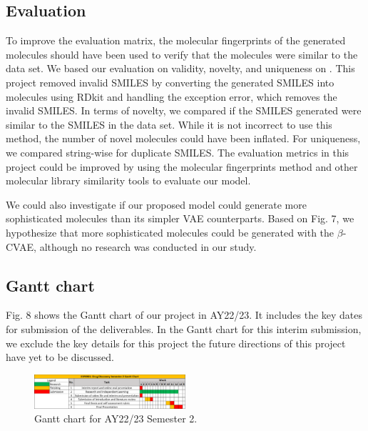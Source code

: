 \subsection{Evaluation}
To improve the evaluation matrix, the molecular fingerprints of the generated molecules should have been used to verify that the molecules were similar to the data set. We based our evaluation on validity, novelty, and uniqueness on \cite{https://doi.org/10.48550/arxiv.1705.10843}. This project removed invalid SMILES by converting the generated SMILES into molecules using RDkit and handling the exception error, which removes the invalid SMILES. In terms of novelty, we compared if the SMILES generated were similar to the SMILES in the data set. While it is not incorrect to use this method, the number of novel molecules could have been inflated. For uniqueness, we compared string-wise for duplicate SMILES. The evaluation metrics in this project could be improved by using the molecular fingerprints method and other molecular library similarity tools to evaluate our model.  

We could also investigate if our proposed model could generate more sophisticated molecules than its simpler VAE counterparts. Based on Fig. 7, we hypothesize that more sophisticated molecules could be generated with the $\beta$-CVAE, although no research was conducted in our study. 

\subsection{Gantt chart}
Fig. 8 shows the Gantt chart of our project in AY22/23. It includes the key dates for submission of the deliverables. In the Gantt chart for this interim submission, we exclude the key details for this project the future directions of this project have yet to be discussed.

\begin{figure}[htbp]
    \centerline{\includegraphics[width=0.5\textwidth]{gantt.png}}
    \caption{Gantt chart for AY22/23 Semester 2.}
    \label{fig}
\end{figure}